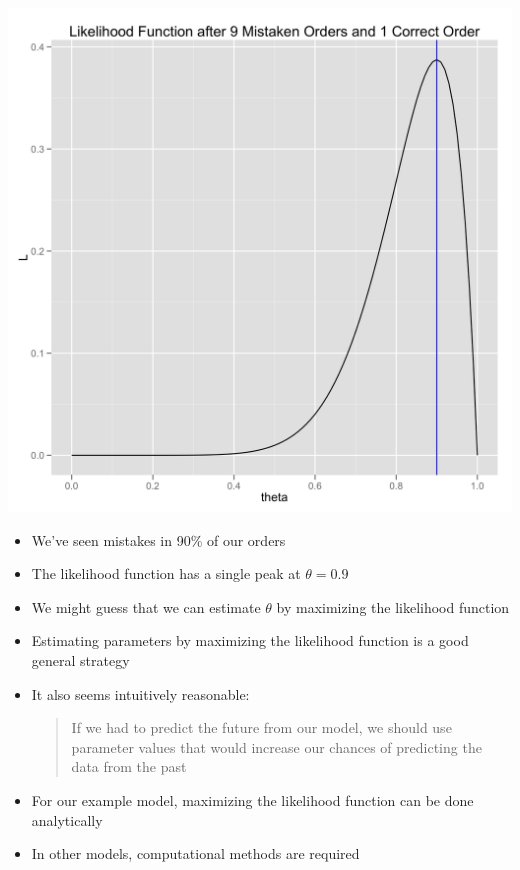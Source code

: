 \documentclass{beamer}
\begin{document}
\frame
{
  \begin{center}
    \includegraphics[scale = 0.1]{likelihood_function_mle.png}
  \end{center}
}

\frame
{
 \begin{itemize}
   \item{We've seen mistakes in 90\% of our orders}
   \item{The likelihood function has a single peak at $\theta = 0.9$}
   \item{We might guess that we can estimate $\theta$ by maximizing the likelihood function}
 \end{itemize}
}

\frame
{
  \begin{itemize}
    \item{Estimating parameters by maximizing the likelihood function is a good general strategy}
    \item{It also seems intuitively reasonable:}
    \begin{quote}
If we had to predict the future from our model, we should use parameter values that would increase our chances of predicting the data from the past
\end{quote}
  \end{itemize}
}

\frame
{
  \begin{itemize}
    \item{For our example model, maximizing the likelihood function can be done analytically}
    \item{In other models, computational methods are required}
  \end{itemize}
}
\end{document}
